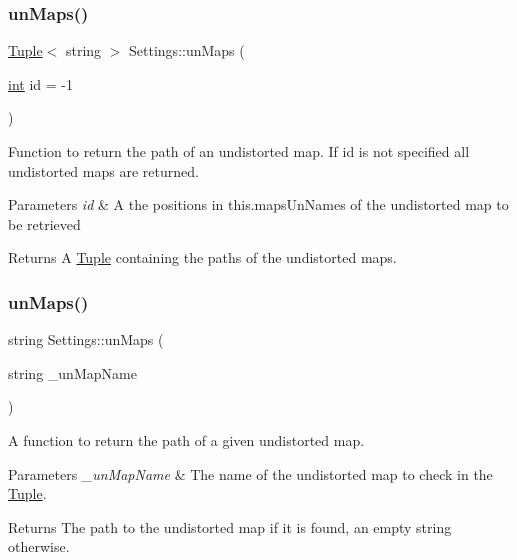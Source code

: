 \subsubsection{\texorpdfstring{unMaps()}{unMaps()}\hspace{0.1cm}{\footnotesize\ttfamily [2/4]}}
{\footnotesize\ttfamily \mbox{\hyperlink{class_tuple}{Tuple}}$<$ string $>$ Settings\+::un\+Maps (\begin{DoxyParamCaption}\item[{\mbox{\hyperlink{draw_8hh_aa620a13339ac3a1177c86edc549fda9b}{int}}}]{id = {\ttfamily -\/1} }\end{DoxyParamCaption})}



Function to return the path of an undistorted map. If id is not specified all undistorted maps are returned. 


\begin{DoxyParams}{Parameters}
{\em id} & A the positions in this.\+maps\+Un\+Names of the undistorted map to be retrieved \\
\hline
\end{DoxyParams}
\begin{DoxyReturn}{Returns}
A \mbox{\hyperlink{class_tuple}{Tuple}} containing the paths of the undistorted maps. 
\end{DoxyReturn}
\mbox{\label{class_settings_a6e62c5eb18f6abc4bcbcd11e018fda8b}} 
\subsubsection{\texorpdfstring{unMaps()}{unMaps()}\hspace{0.1cm}{\footnotesize\ttfamily [3/4]}}
{\footnotesize\ttfamily string Settings\+::un\+Maps (\begin{DoxyParamCaption}\item[{string}]{\+\_\+un\+Map\+Name }\end{DoxyParamCaption})}



A function to return the path of a given undistorted map. 


\begin{DoxyParams}{Parameters}
{\em \+\_\+un\+Map\+Name} & The name of the undistorted map to check in the \mbox{\hyperlink{class_tuple}{Tuple}}. \\
\hline
\end{DoxyParams}
\begin{DoxyReturn}{Returns}
The path to the undistorted map if it is found, an empty string otherwise. 
\end{DoxyReturn}
\mbox{\label{class_settings_aa89550d142cb4101faf35af214f4edff}} 

